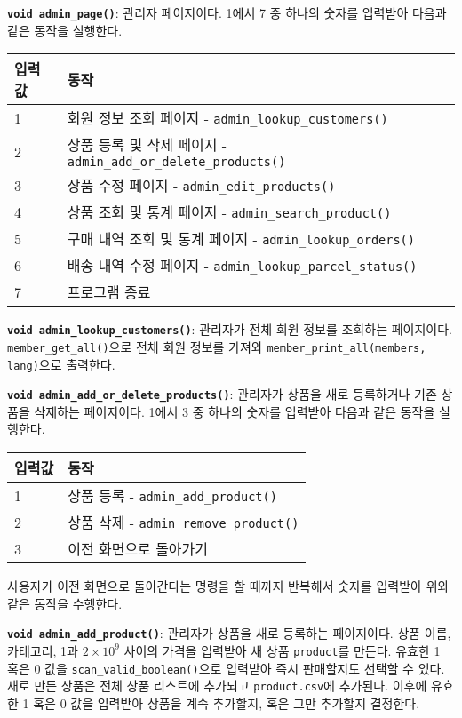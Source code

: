 \documentclass[runningheads]{llncs}
\begin{document}
\textbf{\texttt{void admin_page()}}: 관리자 페이지이다. 1에서 7 중 하나의 숫자를 입력받아 다음과 같은 동작을 실행한다.

\begin{tabularx}{\textwidth}{l|X}
	\hline
		입력값	& 동작 \\
	\hline
		1 & 회원 정보 조회 페이지 - \texttt{admin_lookup_customers()} \\
		2 & 상품 등록 및 삭제 페이지 - \texttt{admin_add_or_delete_products()} \\
		3 & 상품 수정 페이지 - \texttt{admin_edit_products()} \\
		4 & 상품 조회 및 통계 페이지 - \texttt{admin_search_product()} \\
		5 & 구매 내역 조회 및 통계 페이지 - \texttt{admin_lookup_orders()} \\
		6 & 배송 내역 수정 페이지 - \texttt{admin_lookup_parcel_status()} \\
		7 & 프로그램 종료 \\
	\hline
\end{tabularx}

\textbf{\texttt{void admin_lookup_customers()}}: 관리자가 전체 회원 정보를 조회하는 페이지이다. \texttt{member_get_all()}으로 전체 회원 정보를 가져와 \texttt{member_print_all(members, lang)}으로 출력한다.

\textbf{\texttt{void admin_add_or_delete_products()}}: 관리자가 상품을 새로 등록하거나 기존 상품을 삭제하는 페이지이다. 1에서 3 중 하나의 숫자를 입력받아 다음과 같은 동작을 실행한다.

\begin{tabularx}{\textwidth}{l|X}
	\hline
		입력값	& 동작 \\
	\hline
		1 & 상품 등록 - \texttt{admin_add_product()} \\
		2 & 상품 삭제 - \texttt{admin_remove_product()} \\
		3 & 이전 화면으로 돌아가기 \\
	\hline
\end{tabularx}

사용자가 이전 화면으로 돌아간다는 명령을 할 때까지 반복해서 숫자를 입력받아 위와 같은 동작을 수행한다.

\textbf{\texttt{void admin_add_product()}}: 관리자가 상품을 새로 등록하는 페이지이다. 상품 이름, 카테고리, 1과 $2\times{10}^{9}$ 사이의 가격을 입력받아 새 상품 \texttt{product}를 만든다. 유효한 1 혹은 0 값을 \texttt{scan_valid_boolean()}으로 입력받아 즉시 판매할지도 선택할 수 있다. 새로 만든 상품은 전체 상품 리스트에 추가되고 \texttt{product.csv}에 추가된다. 이후에 유효한 1 혹은 0 값을 입력받아 상품을 계속 추가할지, 혹은 그만 추가할지 결정한다.
\end{document}
